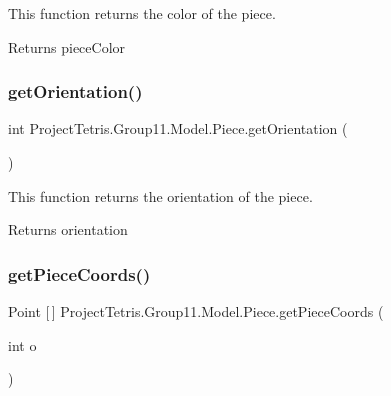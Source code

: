 This function returns the color of the piece. 

\begin{DoxyReturn}{Returns}
piece\+Color 
\end{DoxyReturn}
\hypertarget{class_project_tetris_1_1_group11_1_1_model_1_1_piece_aaad692840f784a0a1fd016a64830240e}{}\label{class_project_tetris_1_1_group11_1_1_model_1_1_piece_aaad692840f784a0a1fd016a64830240e} 
\subsubsection{\texorpdfstring{get\+Orientation()}{getOrientation()}}
{\footnotesize\ttfamily int Project\+Tetris.\+Group11.\+Model.\+Piece.\+get\+Orientation (\begin{DoxyParamCaption}{ }\end{DoxyParamCaption})}



This function returns the orientation of the piece. 

\begin{DoxyReturn}{Returns}
orientation 
\end{DoxyReturn}
\hypertarget{class_project_tetris_1_1_group11_1_1_model_1_1_piece_ad8329552a5f8d91046075dca5d8897fd}{}\label{class_project_tetris_1_1_group11_1_1_model_1_1_piece_ad8329552a5f8d91046075dca5d8897fd} 
\subsubsection{\texorpdfstring{get\+Piece\+Coords()}{getPieceCoords()}}
{\footnotesize\ttfamily Point \mbox{[}$\,$\mbox{]} Project\+Tetris.\+Group11.\+Model.\+Piece.\+get\+Piece\+Coords (\begin{DoxyParamCaption}\item[{int}]{o }\end{DoxyParamCaption})}



